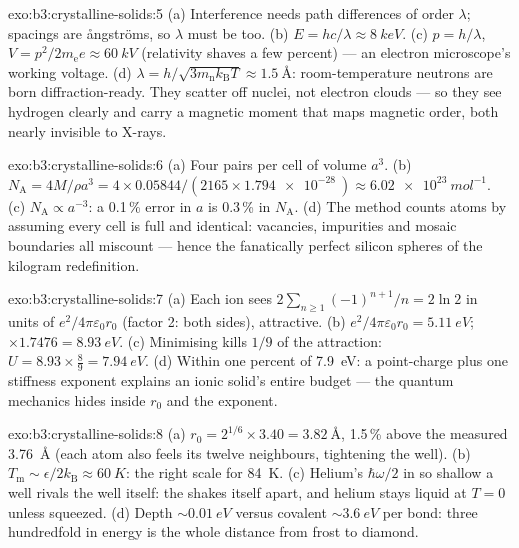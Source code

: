 \begin{solution}{exo:b3:crystalline-solids:5}
(a) Interference needs path differences of order $\lambda$;
spacings are ångströms, so $\lambda$ must be too. (b) $E =
hc/\lambda \approx \qty{8}{keV}$. (c) $p = h/\lambda$, $V =
p^2/2m_{\text{e}}e \approx \qty{60}{kV}$ (relativity shaves a few
percent) --- an electron microscope's working voltage. (d)
$\lambda = h/\sqrt{3m_{\text{n}}k_{\text{B}}T} \approx
\qty{1.5}{\angstrom}$: room-temperature neutrons are born
diffraction-ready. They scatter off nuclei, not electron clouds
--- so they see hydrogen clearly and carry a magnetic moment
that maps magnetic order, both nearly invisible to X-rays.
\end{solution}

\begin{solution}{exo:b3:crystalline-solids:6}
(a) Four pairs per cell of volume $a^3$. (b) $N_{\text{A}} =
4M/\rho a^3 = 4\times0.05844/(2165\times\qty{1.794e-28}{})
\approx \qty{6.02e23}{mol^{-1}}$. (c) $N_{\text{A}} \propto
a^{-3}$: a 0.1\,\% error in $a$ is 0.3\,\% in $N_{\text{A}}$. (d)
The method counts atoms by assuming every cell is full and
identical: vacancies, impurities and mosaic boundaries all
miscount --- hence the fanatically perfect silicon spheres of the
kilogram redefinition.
\end{solution}

\begin{solution}{exo:b3:crystalline-solids:7}
(a) Each ion sees $2\sum_{n\ge1}(-1)^{n+1}/n = 2\ln2$ in units of
$e^2/4\pi\varepsilon_0r_0$ (factor 2: both sides), attractive. (b)
$e^2/4\pi\varepsilon_0r_0 = \qty{5.11}{eV}$; $\times1.7476 =
\qty{8.93}{eV}$. (c) Minimising kills $1/9$ of the attraction:
$U = 8.93\times\tfrac89 = \qty{7.94}{eV}$. (d) Within one percent
of \qty{7.9}{eV}: a point-charge  plus one stiffness
exponent explains an ionic solid's entire budget --- the quantum
mechanics hides inside $r_0$ and the exponent.
\end{solution}

\begin{solution}{exo:b3:crystalline-solids:8}
(a) $r_0 = 2^{1/6}\times3.40 = \qty{3.82}{\angstrom}$, 1.5\,\%
above the measured \qty{3.76}{\angstrom} (each atom also feels
its twelve neighbours, tightening the well). (b)
$T_{\text{m}} \sim \epsilon/2k_{\text{B}} \approx \qty{60}{K}$:
the right scale for \qty{84}{K}. (c) Helium's 
$\hbar\omega/2$ in so shallow a well rivals the well itself: the
 shakes itself apart, and helium stays liquid at $T = 0$
unless squeezed. (d) Depth $\sim\qty{0.01}{eV}$ versus covalent
$\sim\qty{3.6}{eV}$ per bond: three hundredfold in energy is the
whole distance from frost to diamond.
\end{solution}

